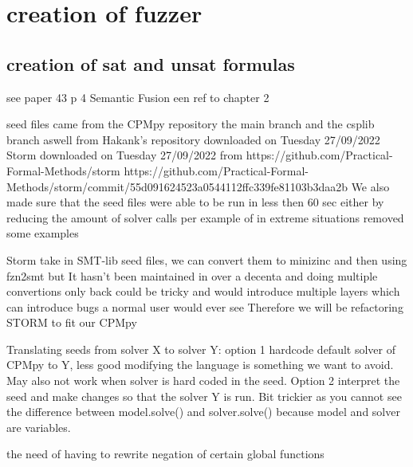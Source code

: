 \chapter{creation of fuzzer}
\label{cha:x}


\section{creation of sat and unsat formulas}
see paper 43 p 4
Semantic Fusion
\cite{43YinYang}
een ref to chapter 2

seed files came from the CPMpy repository the main branch and the csplib branch aswell from Hakank's repository downloaded on Tuesday 27/09/2022
Storm downloaded on Tuesday 27/09/2022 from https://github.com/Practical-Formal-Methods/storm 
https://github.com/Practical-Formal-Methods/storm/commit/55d091624523a0544112ffc339fe81103b3daa2b
We also made sure that the seed files were able to be run in less then 60 sec either by reducing the amount of solver calls per example of in extreme situations removed some examples


Storm take in SMT-lib seed files, we can convert them to minizinc and then using fzn2smt but It hasn't been maintained in over a decenta and doing multiple convertions only back could be tricky and would introduce multiple layers which can introduce bugs a normal user would ever see
Therefore we will be refactoring STORM to fit our CPMpy


Translating seeds from solver X to solver Y: 
option 1 hardcode default solver of CPMpy to Y, less good modifying the language is something we want to avoid. May also not work when solver is hard coded in the seed.
Option 2 interpret the seed and make changes so that the solver Y is run. Bit trickier as you cannot see the difference between model.solve() and solver.solve() because model and solver are variables.



the need of having to rewrite negation of certain global functions


















